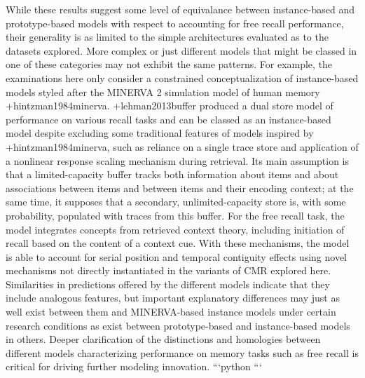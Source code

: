 {}While these results suggest some level of equivalance between instance-based and prototype-based models with respect to accounting for free recall performance, their generality is as limited to the simple architectures evaluated as to the datasets explored. More complex or just different models that might be classed in one of these categories may not exhibit the same patterns. For example, the examinations here only consider a constrained conceptualization of instance-based models styled after the MINERVA 2 simulation model of human memory +{}{}{hintzman1984minerva}. +{}{}{lehman2013buffer} produced a dual store model of performance on various recall tasks and can be classed as an instance-based model despite excluding some traditional features of models inspired by +{}{}{hintzman1984minerva}, such as reliance on a single trace store and application of a nonlinear response scaling mechanism during retrieval. Its main assumption is that a limited-capacity buffer tracks both information about items and about associations between items and between items and their encoding context; at the same time, it supposes that a secondary, unlimited-capacity store is, with some probability, populated with traces from this buffer. For the free recall task, the model integrates concepts from retrieved context theory, including initiation of recall based on the content of a context cue. With these mechanisms, the model is able to account for serial position and temporal contiguity effects using novel mechanisms not directly instantiated in the variants of CMR explored here. Similarities in predictions offered by the different models indicate that they include analogous features, but important explanatory differences may just as well exist between them and MINERVA-based instance models under certain research conditions as exist between prototype-based and instance-based models in others. Deeper clarification of the distinctions and homologies between different models characterizing performance on memory tasks such as free recall is critical for driving further modeling innovation.\markdownRendererInterblockSeparator
{}```python\markdownRendererInterblockSeparator
{}```\relax